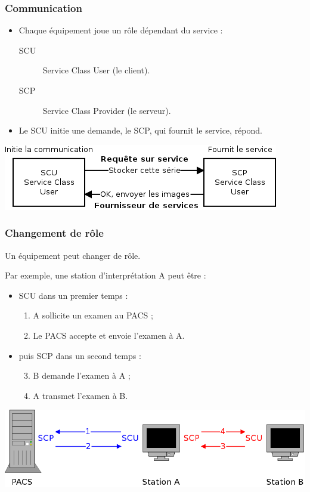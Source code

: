 \frame
{
	\frametitle{Communication}
	\begin{itemize}
		\item Chaque \'equipement joue un r\^ole d\'ependant du service :
		\begin{description}
			\item[SCU] Service Class User (le client).
			\item[SCP] Service Class Provider (le serveur).
		\end{description}
		\item Le SCU initie une demande, le SCP, qui fournit le service, r\'epond.
	\end{itemize}
	
	\begin{center}
		\includegraphics[width=.8\linewidth]{./figures/scu-scp.png}
	\end{center}
}

\frame
{
	\frametitle{Changement de r\^ole}
	Un \'equipement peut changer de r\^ole.
	
	Par exemple, une station d'interpr\'etation A peut \^etre :
	\begin{itemize}
		\item SCU dans un premier temps :
		\begin{enumerate}
			\item A sollicite un examen au PACS ;
			\item Le PACS accepte et envoie l'examen \`a A.
		\end{enumerate}
		\item puis SCP dans un second temps :
		\begin{enumerate}
		\setcounter{enumi}{2}
			\item B demande l'examen \`a A ;
			\item A transmet l'examen \`a B.
		\end{enumerate}
	\end{itemize}
	
	\includegraphics[width=\linewidth]{./figures/roles-4.png}
}

